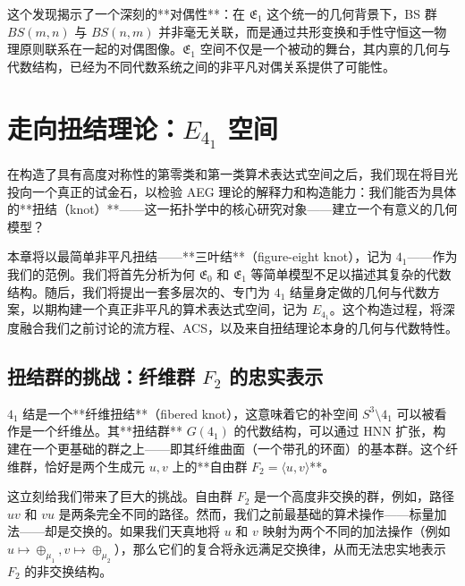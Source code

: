 \documentclass[a4paper,12pt]{book}
\numberwithin{problem}{section}
\numberwithin{definition}{section}
\numberwithin{lemma}{section}
\numberwithin{proposition}{section}
\numberwithin{theorem}{section}
\numberwithin{grammar}{section}
\numberwithin{program}{section}
\numberwithin{convention}{section}
\numberwithin{corollary}{section}
\begin{document}
这个发现揭示了一个深刻的**对偶性**：在 $\mathfrak{E}_1$ 这个统一的几何背景下，BS 群 $BS(m,n)$ 与 $BS(n,m)$ 并非毫无关联，而是通过共形变换和手性守恒这一物理原则联系在一起的对偶图像。$\mathfrak{E}_1$ 空间不仅是一个被动的舞台，其内禀的几何与代数结构，已经为不同代数系统之间的非平凡对偶关系提供了可能性。


\chapter{走向扭结理论：\texorpdfstring{$E_{4_1}$}{E4_1} 空间}
\label{chap:space_e41}

在构造了具有高度对称性的第零类和第一类算术表达式空间之后，我们现在将目光投向一个真正的试金石，以检验 AEG 理论的解释力和构造能力：我们能否为具体的**扭结（knot）**——这一拓扑学中的核心研究对象——建立一个有意义的几何模型？

本章将以最简单非平凡扭结——**三叶结**（figure-eight knot），记为 $4_1$——作为我们的范例。我们将首先分析为何 $\mathfrak{E}_0$ 和 $\mathfrak{E}_1$ 等简单模型不足以描述其复杂的代数结构。随后，我们将提出一套多层次的、专门为 $4_1$ 结量身定做的几何与代数方案，以期构建一个真正非平凡的算术表达式空间，记为 $E_{4_1}$。这个构造过程，将深度融合我们之前讨论的流方程、ACS，以及来自扭结理论本身的几何与代数特性。

\section{扭结群的挑战：纤维群 \texorpdfstring{$F_2$}{F2} 的忠实表示}
\label{sec:e41_challenge}

$4_1$ 结是一个**纤维扭结**（fibered knot），这意味着它的补空间 $S^3 \setminus 4_1$ 可以被看作是一个纤维丛。其**扭结群** $G(4_1)$ 的代数结构，可以通过 HNN 扩张，构建在一个更基础的群之上——即其纤维曲面（一个带孔的环面）的基本群。这个纤维群，恰好是两个生成元 $u, v$ 上的**自由群 $F_2 = \langle u, v \rangle$**。

这立刻给我们带来了巨大的挑战。自由群 $F_2$ 是一个高度非交换的群，例如，路径 $uv$ 和 $vu$ 是两条完全不同的路径。然而，我们之前最基础的算术操作——标量加法——却是交换的。如果我们天真地将 $u$ 和 $v$ 映射为两个不同的加法操作（例如 $u \mapsto \oplus_{\mu_1}, v \mapsto \oplus_{\mu_2}$），那么它们的复合将永远满足交换律，从而无法忠实地表示 $F_2$ 的非交换结构。
\end{document}
